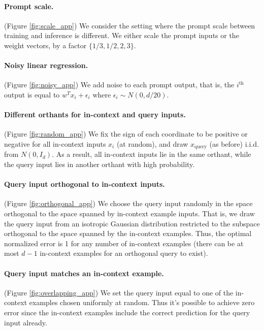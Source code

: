 \documentclass{article}
\begin{document}
\paragraph{Prompt scale.} (Figure \ref{fig:scale_app}) We consider the setting where the prompt scale between training and inference is different. We either scale the prompt inputs or the weight vectors, by a factor $\{1/3, 1/2,  2, 3\}$.

\paragraph{Noisy linear regression.} (Figure \ref{fig:noisy_app}) We add noise to each prompt output, that is, the $i^{\text{th}}$ output is equal to $w^T x_i + \epsilon_i$ where $\epsilon_i \sim N(0, d/20)$. 

\paragraph{Different orthants for in-context and query inputs.}(Figure \ref{fig:random_app}) We fix the sign of each coordinate to be positive or negative for all in-context inputs $x_i$ (at random), and draw $x_\text{query}$ (as before) i.i.d. from $N(0, I_d)$. 
As a result, all in-context inputs lie in the same orthant, while the query input lies in another orthant with high probability.

\paragraph{Query input orthogonal to in-context inputs.}(Figure \ref{fig:orthogonal_app}) We choose the query input randomly in the space orthogonal to the space spanned by in-context example inputs.
That is, we  draw the query input from an isotropic Gaussian distribution restricted to the subspace orthogonal to the space spanned by the in-context examples. 
Thus, the optimal normalized error is 1 for any number of in-context examples (there can be at most $d-1$ in-context examples for an orthogonal query to exist).

\paragraph{Query input matches an in-context example.}(Figure \ref{fig:overlapping_app})
We set the query input equal to one of the in-context examples chosen uniformly at random.
Thus it's possible to achieve zero error since the in-context examples include the correct prediction for the query input already.
\end{document}

